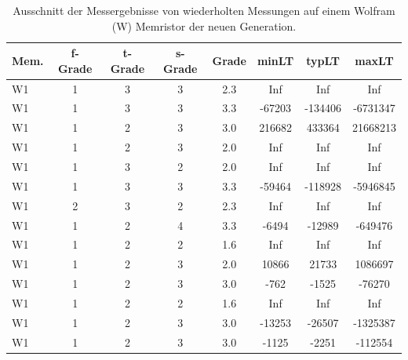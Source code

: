 \begin{table}
  \centering
    \begin{tabular}{l|c|c|c|c|c|c|c}
        \textbf{Mem.} & \textbf{f-Grade} & \textbf{t-Grade} & \textbf{s-Grade} & \textbf{Grade} & \textbf{minLT} & \textbf{typLT} & \textbf{maxLT} \\\hline
         W1           &  1               & 3                &  3               &  2.3           & Inf            & Inf            & Inf     \\
         W1           &  1               & 3                &  3               &  3.3           & -67203         & -134406        & -6731347\\
         W1           &  1               & 2                &  3               &  3.0           & 216682         & 433364         & 21668213\\
         W1           &  1               & 2                &  3               &  2.0           & Inf            & Inf            & Inf     \\
         W1           &  1               & 3                &  2               &  2.0           & Inf            & Inf            & Inf     \\
         W1           &  1               & 3                &  3               &  3.3           & -59464         & -118928        & -5946845\\
         W1           &  2               & 3                &  2               &  2.3           & Inf            & Inf            & Inf     \\
         W1           &  1               & 2                &  4               &  3.3           & -6494          & -12989         & -649476 \\
         W1           &  1               & 2                &  2               &  1.6           & Inf            & Inf            & Inf     \\
         W1           &  1               & 2                &  3               &  2.0           & 10866          & 21733          & 1086697 \\
         W1           &  1               & 2                &  3               &  3.0           & -762           & -1525          & -76270  \\
         W1           &  1               & 2                &  2               &  1.6           & Inf            & Inf            & Inf     \\
         W1           &  1               & 2                &  3               &  3.0           & -13253         & -26507         & -1325387\\
         W1           &  1               & 2                &  3               &  3.0           & -1125          & -2251          & -112554 \\
    \end{tabular}
  \caption{Ausschnitt der Messergebnisse von wiederholten Messungen auf einem Wolfram (W) Memristor der neuen Generation.}
  \label{tab:Messergebnisse_W}
\end{table}

